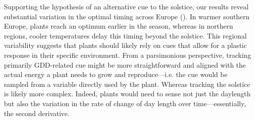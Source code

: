 \documentclass[11pt,letter]{article}
\begin{document}
Supporting the hypothesis of an alternative cue to the solstice, our results reveal substantial variation in the optimal timing across Europe (). In warmer southern Europe, plants reach an optimum earlier in the season, whereas in northern regions, cooler temperatures delay this timing beyond the solstice. 
This regional variability suggests that plants should likely 
rely on cues that allow for a plastic response in their specific environment. 
From a parsimonious perspective, tracking primarily GDD-related cue might be more straightforward and aligned with the actual energy a plant needs to grow and reproduce---i.e. the cue would be sampled from a variable directly used by the plant.
Whereas tracking the solstice is likely more complex. Indeed, plants would need to sense not just the daylength but also the variation in the rate of change of day length over time---essentially, the second derivative.
\end{document}

